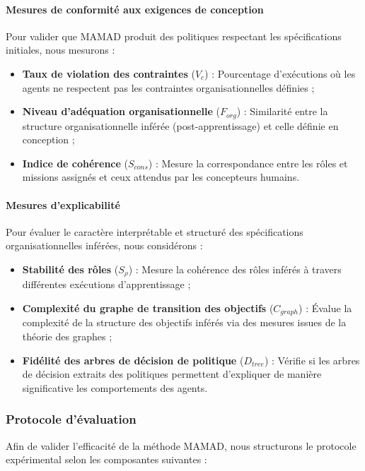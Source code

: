 \paragraph{Mesures de conformité aux exigences de conception}
Pour valider que MAMAD produit des politiques respectant les spécifications initiales, nous mesurons :
\begin{itemize}
    \item \textbf{Taux de violation des contraintes} ($V_c$) : Pourcentage d'exécutions où les agents ne respectent pas les contraintes organisationnelles définies ;
    \item \textbf{Niveau d'adéquation organisationnelle} ($F_{org}$) : Similarité entre la structure organisationnelle inférée (post-apprentissage) et celle définie en conception ;
    \item \textbf{Indice de cohérence} ($S_{cons}$) : Mesure la correspondance entre les rôles et missions assignés et ceux attendus par les concepteurs humains.
\end{itemize}

\paragraph{Mesures d'explicabilité}
Pour évaluer le caractère interprétable et structuré des spécifications organisationnelles inférées, nous considérons :
\begin{itemize}
    \item \textbf{Stabilité des rôles} ($S_{\rho}$) : Mesure la cohérence des rôles inférés à travers différentes exécutions d'apprentissage ;
    \item \textbf{Complexité du graphe de transition des objectifs} ($C_{graph}$) : Évalue la complexité de la structure des objectifs inférés via des mesures issues de la théorie des graphes ;
    \item \textbf{Fidélité des arbres de décision de politique} ($D_{tree}$) : Vérifie si les arbres de décision extraits des politiques permettent d'expliquer de manière significative les comportements des agents.
\end{itemize}

\subsubsection{Protocole d'évaluation}

Afin de valider l'efficacité de la méthode MAMAD, nous structurons le protocole expérimental selon les composantes suivantes :

